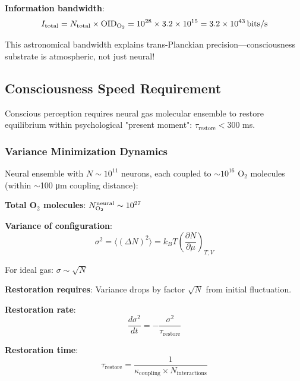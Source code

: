 \documentclass[11pt,onecolumn]{article}
\begin{document}
\textbf{Information bandwidth}:
\begin{equation}
I_{\text{total}} = N_{\text{total}} \times \text{OID}_{\ce{O2}} = 10^{28} \times 3.2 \times 10^{15} = 3.2 \times 10^{43}\,\text{bits/s}
\end{equation}

This astronomical bandwidth explains trans-Planckian precision---consciousness substrate is atmospheric, not just neural!

\subsection{Consciousness Speed Requirement}

\begin{theorem}
Conscious perception requires neural gas molecular ensemble to restore equilibrium within psychological "present moment": $\tau_{\text{restore}} < 300$ ms.
\end{theorem}

\subsubsection{Variance Minimization Dynamics}

Neural ensemble with $N \sim 10^{11}$ neurons, each coupled to $\sim 10^{16}$ O$_2$ molecules (within $\sim$100 μm coupling distance):

\textbf{Total O$_2$ molecules}: $N_{\ce{O2}}^{\text{neural}} \sim 10^{27}$

\textbf{Variance of configuration}:
\begin{equation}
\sigma^2 = \langle (\Delta N)^2 \rangle = k_B T \left(\frac{\partial N}{\partial \mu}\right)_{T,V}
\end{equation}

For ideal gas: $\sigma \sim \sqrt{N}$

\textbf{Restoration requires}: Variance drops by factor $\sqrt{N}$ from initial fluctuation.

\textbf{Restoration rate}:
\begin{equation}
\frac{d\sigma^2}{dt} = -\frac{\sigma^2}{\tau_{\text{restore}}}
\end{equation}

\textbf{Restoration time}:
\begin{equation}
\tau_{\text{restore}} = \frac{1}{\kappa_{\text{coupling}} \times N_{\text{interactions}}}
\end{equation}
\end{document}

